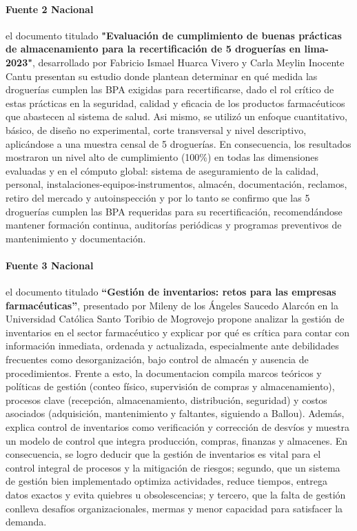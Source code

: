 \documentclass[12pt]{article} %
\begin{document}
\paragraph{Fuente 2 Nacional}

el documento titulado \textbf{\string"Evaluación de cumplimiento de buenas prácticas de almacenamiento para la recertificación de 5 droguerías en lima-2023"}, desarrollado por Fabricio Ismael Huarca Vivero y Carla Meylin Inocente Cantu presentan su estudio donde plantean determinar en qué medida las droguerías cumplen las BPA exigidas para recertificarse, dado el rol crítico de estas prácticas en la seguridad, calidad y eficacia de los productos farmacéuticos que abastecen al sistema de salud. Asi mismo, se utilizó un enfoque cuantitativo, básico, de diseño no experimental, corte transversal y nivel descriptivo, aplicándose a una muestra censal de 5 droguerías. En consecuencia, los resultados mostraron un nivel alto de cumplimiento (100\%) en todas las dimensiones evaluadas y en el cómputo global: sistema de aseguramiento de la calidad, personal, instalaciones-equipos-instrumentos, almacén, documentación, reclamos, retiro del mercado y autoinspección y por lo tanto se confirmo que las 5 droguerías cumplen las BPA requeridas para su recertificación, recomendándose mantener formación continua, auditorías periódicas y programas preventivos de mantenimiento y documentación.

\paragraph{Fuente 3 Nacional}

el documento titulado \textbf{“Gestión de inventarios: retos para las empresas farmacéuticas”}, presentado por Mileny de los Ángeles Saucedo Alarcón en la Universidad Católica Santo Toribio de Mogrovejo propone analizar la gestión de inventarios en el sector farmacéutico y explicar por qué es crítica para contar con información inmediata, ordenada y actualizada, especialmente ante debilidades frecuentes como desorganización, bajo control de almacén y ausencia de procedimientos. Frente a esto, la documentacion compila marcos teóricos y políticas de gestión (conteo físico, supervisión de compras y almacenamiento), procesos clave (recepción, almacenamiento, distribución, seguridad) y costos asociados (adquisición, mantenimiento y faltantes, siguiendo a Ballou). Además, explica control de inventarios como verificación y corrección de desvíos y muestra un modelo de control que integra producción, compras, finanzas y almacenes. En consecuencia, se logro deducir que la gestión de inventarios es vital para el control integral de procesos y la mitigación de riesgos; segundo, que un sistema de gestión bien implementado optimiza actividades, reduce tiempos, entrega datos exactos y evita quiebres u obsolescencias; y tercero, que la falta de gestión conlleva desafíos organizacionales, mermas y menor capacidad para satisfacer la demanda.
\end{document}

